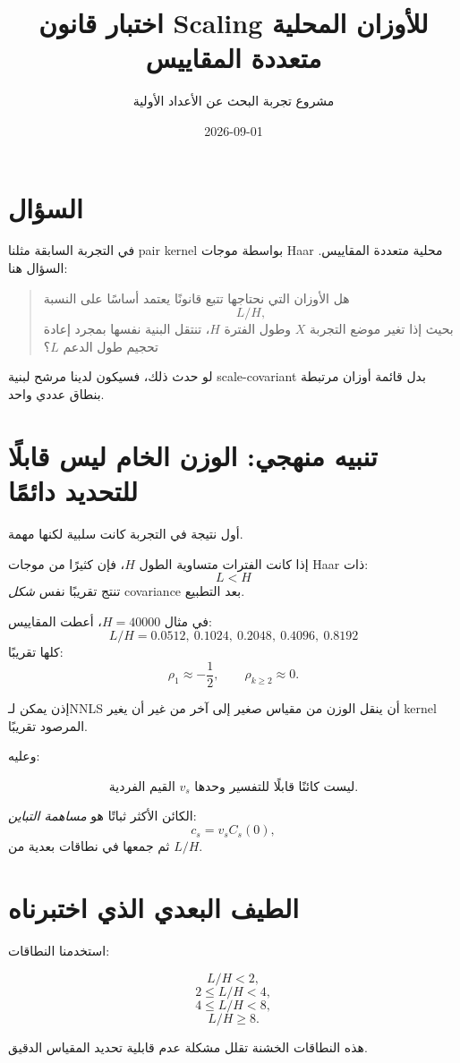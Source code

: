 \documentclass[12pt]{article}
\title{اختبار قانون Scaling للأوزان المحلية متعددة المقاييس}
\author{مشروع تجربة البحث عن الأعداد الأولية}
\date{2026-09-01}
\begin{document}
\maketitle

\section{السؤال}

في التجربة السابقة مثلنا pair kernel بواسطة موجات Haar محلية متعددة المقاييس.
السؤال هنا:

\begin{quote}
هل الأوزان التي نحتاجها تتبع قانونًا يعتمد أساسًا على النسبة
\[
L/H,
\]
بحيث إذا تغير موضع التجربة \(X\) وطول الفترة \(H\)، تنتقل البنية نفسها
بمجرد إعادة تحجيم طول الدعم \(L\)؟
\end{quote}

لو حدث ذلك، فسيكون لدينا مرشح لبنية scale-covariant بدل قائمة أوزان
مرتبطة بنطاق عددي واحد.

\section{تنبيه منهجي: الوزن الخام ليس قابلًا للتحديد دائمًا}

أول نتيجة في التجربة كانت سلبية لكنها مهمة.

إذا كانت الفترات متساوية الطول \(H\)، فإن كثيرًا من موجات Haar ذات:
\[
L<H
\]
تنتج تقريبًا نفس \emph{شكل} covariance بعد التطبيع.

في مثال \(H=40000\)، أعطت المقاييس:
\[
L/H=0.0512,\ 0.1024,\ 0.2048,\ 0.4096,\ 0.8192
\]
كلها تقريبًا:
\[
\rho_1\approx-\frac12,
\qquad
\rho_{k\ge2}\approx0.
\]

إذن يمكن لـNNLS أن ينقل الوزن من مقياس صغير إلى آخر من غير أن يغير
kernel المرصود تقريبًا.

وعليه:

\[
\boxed{
\text{القيم الفردية }v_s\text{ ليست كائنًا قابلًا للتفسير وحدها.}
}
\]

الكائن الأكثر ثباتًا هو \emph{مساهمة التباين}:
\[
c_s=v_sC_s(0),
\]
ثم جمعها في نطاقات بعدية من \(L/H\).

\section{الطيف البعدي الذي اختبرناه}

استخدمنا النطاقات:

\[
L/H<2,
\]
\[
2\le L/H<4,
\]
\[
4\le L/H<8,
\]
\[
L/H\ge8.
\]

هذه النطاقات الخشنة تقلل مشكلة عدم قابلية تحديد المقياس الدقيق.
\end{document}
